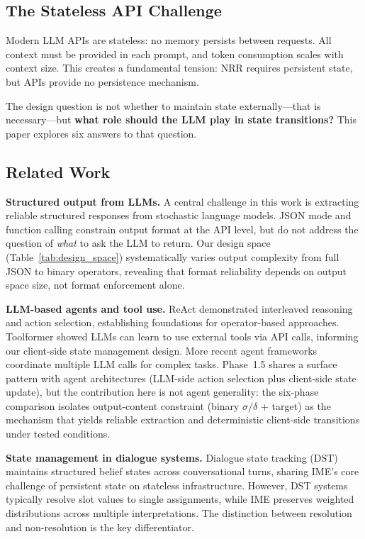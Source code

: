 \documentclass[11pt,a4paper]{article}
\begin{document}
\subsection{The Stateless API Challenge}

Modern LLM APIs are stateless: no memory persists between requests. All context
must be provided in each prompt, and token consumption scales with context size.
This creates a fundamental tension: NRR requires persistent state, but APIs provide
no persistence mechanism.

The design question is not whether to maintain state externally---that is
necessary---but \textbf{what role should the LLM play in state transitions?}
This paper explores six answers to that question.

\subsection{Related Work}

\textbf{Structured output from LLMs.}
A central challenge in this work is extracting reliable structured responses from
stochastic language models. JSON mode and function calling
\cite{openai2024structured} constrain output format at the API level, but do not
address the question of \textit{what} to ask the LLM to return. Our design space
(Table~\ref{tab:design_space}) systematically varies output complexity from full
JSON to binary operators, revealing that format reliability depends on output
space size, not format enforcement alone.

\textbf{LLM-based agents and tool use.}
ReAct \cite{yao2023react} demonstrated interleaved reasoning and action selection,
establishing foundations for operator-based approaches. Toolformer
\cite{schick2023toolformer} showed LLMs can learn to use external tools via API
calls, informing our client-side state management design. More recent agent
frameworks \cite{wang2024survey} coordinate multiple LLM calls for complex tasks.
Phase~1.5 shares a surface pattern with agent architectures (LLM-side action
selection plus client-side state update), but the contribution here is not
agent generality: the six-phase comparison isolates output-content constraint
(binary $\sigma/\delta$ + target) as the mechanism that yields reliable
extraction and deterministic client-side transitions under tested conditions.

\textbf{State management in dialogue systems.}
Dialogue state tracking (DST) \cite{budzianowski2018multiwoz} maintains structured
belief states across conversational turns, sharing IME's core challenge of
persistent state on stateless infrastructure. However, DST systems typically
resolve slot values to single assignments, while IME preserves weighted
distributions across multiple interpretations. The distinction between resolution
and non-resolution is the key differentiator.
\end{document}
